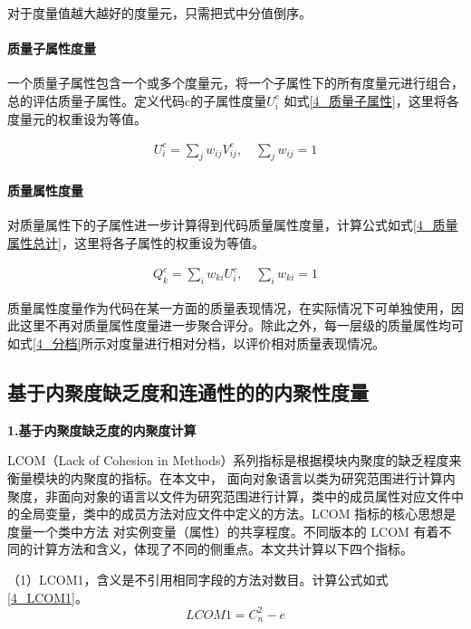 对于度量值越大越好的度量元，只需把式中分值倒序。

\paragraph{质量子属性度量} 一个质量子属性包含一个或多个度量元，将一个子属性下的所有度量元进行组合，总的评估质量子属性。定义代码c的子属性度量$U_{i}^c$ 如式\ref{4_质量子属性}，这里将各度量元的权重设为等值。

\begin{align}
\label{4_质量子属性}
U_i^c = \sum_j w_{ij} V_{ij}^c, \quad \sum_j w_{ij} = 1
\end{align}

\paragraph{质量属性度量} 对质量属性下的子属性进一步计算得到代码质量属性度量，计算公式如式\ref{4_质量属性总计}，这里将各子属性的权重设为等值。

\begin{align}
\label{4_质量属性总计}
Q_k^c = \sum_i w_{ki} U_{i}^c, \quad \sum_i w_{ki} = 1
\end{align}

质量属性度量作为代码在某一方面的质量表现情况，在实际情况下可单独使用，因此这里不再对质量属性度量进一步聚合评分。除此之外，每一层级的质量属性均可如式\ref{4_分档}所示对度量进行相对分档，以评价相对质量表现情况。

\subsection{基于内聚度缺乏度和连通性的的内聚性度量}

\noindent \textbf{1.基于内聚度缺乏度的内聚度计算}

 LCOM（Lack of Cohesion in Methods）系列指标是根据模块内聚度的缺乏程度来衡量模块的内聚度的指标。在本文中，
面向对象语言以类为研究范围进行计算内聚度，非面向对象的语言以文件为研究范围进行计算，类中的成员属性对应文件中的全局变量，类中的成员方法对应文件中定义的方法。LCOM 指标的核心思想是度量一个类中方法
对实例变量（属性）的共享程度。不同版本的 LCOM 有着不同的计算方法和含义，体现了不同的侧重点。本文共计算以下四个指标。

（1）LCOM1，含义是不引用相同字段的方法对数目\cite{1994Ametr}。计算公式如式\ref{4_LCOM1}。
\begin{equation}
\label{4_LCOM1}
LCOM1 = C_{n}^{2}-e
\end{equation}

